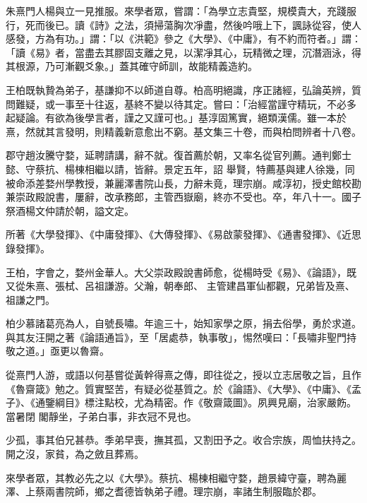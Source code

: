 \begin{pinyinscope}
 朱熹門人楊與立一見推服。來學者眾，嘗謂：「為學立志貴堅，規模貴大，充踐服行，死而後已。讀《詩》之法，須掃蕩胸次凈盡，然後吟哦上下，諷詠從容，使人感發，方為有功。」謂：「以《洪範》參之《大學》、《中庸》，有不約而符者。」謂：「讀《易》者，當盡去其膠固支離之見，以潔凈其心，玩精微之理，沉潛涵泳，得其根源，乃可漸觀爻象。」蓋其確守師訓，故能精義造約。



 王柏既執贄為弟子，基謙抑不以師道自尊。柏高明絕識，序正諸經，弘論英辨，質問難疑，或一事至十往返，基終不變以待其定。嘗曰：「治經當謹守精玩，不必多起疑論。有欲為後學言者，謹之又謹可也。」基淳固篤實，絕類漢儒。雖一本於熹，然就其言發明，則精義新意愈出不窮。基文集三十卷，而與柏問辨者十八卷。



 郡守趙汝騰守婺，延聘請講，辭不就。復首薦於朝，又率名從官列薦。通判鄭士懿、守蔡抗、楊棟相繼以請，皆辭。景定五年，詔
 舉賢，特薦基與建人徐幾，同被命添差婺州學教授，兼麗澤書院山長，力辭未竟，理宗崩。咸淳初，授史館校勘兼崇政殿說書，屢辭，改承務郎，主管西嶽廟，終亦不受也。卒，年八十一。國子祭酒楊文仲請於朝，謚文定。



 所著《大學發揮》、《中庸發揮》、《大傳發揮》、《易啟蒙發揮》、《通書發揮》、《近思錄發揮》。



 王柏，字會之，婺州金華人。大父崇政殿說書師愈，從楊時受《易》、《論語》，既又從朱熹、張栻、呂祖謙游。父瀚，朝奉郎、
 主管建昌軍仙都觀，兄弟皆及熹、祖謙之門。



 柏少慕諸葛亮為人，自號長嘯。年逾三十，始知家學之原，捐去俗學，勇於求道。與其友汪開之著《論語通旨》，至「居處恭，執事敬」，惕然嘆曰：「長嘯非聖門持敬之道。」亟更以魯齋。



 從熹門人游，或語以何基嘗從黃幹得熹之傳，即往從之，授以立志居敬之旨，且作《魯齋箴》勉之。質實堅苦，有疑必從基質之。於《論語》、《大學》、《中庸》、《孟子》、《通鑒綱目》標注點校，尤為精密。作《敬齋箴圖》。夙興見廟，治家嚴飭。當暑閉
 閣靜坐，子弟白事，非衣冠不見也。



 少孤，事其伯兄甚恭。季弟早喪，撫其孤，又割田予之。收合宗族，周恤扶持之。開之沒，家貧，為之斂且葬焉。



 來學者眾，其教必先之以《大學》。蔡抗、楊棟相繼守婺，趙景緯守臺，聘為麗澤、上蔡兩書院師，鄉之耆德皆執弟子禮。理宗崩，率諸生制服臨於郡。




\end{pinyinscope}
